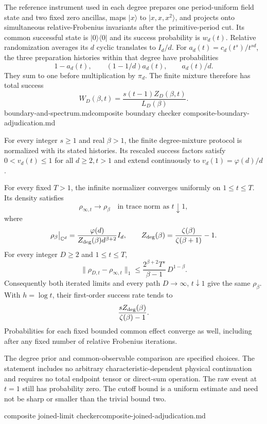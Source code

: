 The reference instrument used in each degree prepares one period-uniform
field state and two fixed zero ancillas, maps $|x\rangle$ to
$|x,x,x^2\rangle$, and projects onto simultaneous relative-Frobenius
invariants after the primitive-period cut. Its common successful state is
$|0\rangle\langle0|$ and its success probability is $w_d(t)$. Relative
randomization averages its $d$ cyclic translates to $I_d/d$.
For $a_d(t)=c_d(t^s)/t^{sd}$, the three preparation histories within
that degree have probabilities
\[
 1-a_d(t),\qquad (1-1/d)a_d(t),\qquad a_d(t)/d.
\]
They sum to one before multiplication by $\pi_d$. The finite mixture
therefore has total success
\[
 W_D(\beta,t)=\frac{s(t-1)Z_D(\beta,t)}{L_D(\beta)}.
\]
{boundary-and-spectrum.md}{composite boundary checker}
{composite-boundary-adjudication.md}

\begin{theorem}
\statusSketch\quad
For every integer $s\geq1$ and real $\beta>1$, the finite degree-mixture
protocol is normalized with its stated histories. Its rescaled success
factors satisfy $0<v_d(t)\leq1$ for all $d\geq2,t>1$ and extend
continuously to $v_d(1)=\varphi(d)/d$.

For every fixed $T>1$, the infinite normalizer converges uniformly on
$1\leq t\leq T$. Its density satisfies
\[
 \rho_{\infty,t}\longrightarrow\rho_\beta
       \quad\text{in trace norm as }t\downarrow1,
\]
where
\[
 \rho_\beta\big|_{\mathbb C^d}
 =\frac{\varphi(d)}{Z_{\rm deg}(\beta)d^{\beta+2}}I_d,\qquad
 Z_{\rm deg}(\beta)=\frac{\zeta(\beta)}{\zeta(\beta+1)}-1.
\]
For every integer $D\geq2$ and $1\leq t\leq T$,
\[
 \|\rho_{D,t}-\rho_{\infty,t}\|_1
 \leq \frac{2^{\beta+2}T^s}{\beta-1}\,D^{1-\beta}.
\]
Consequently both iterated limits and every path $D\to\infty$, $t\downarrow1$
give the same $\rho_\beta$. With $h=\log t$, their first-order success rate
tends to
\[
 \frac{sZ_{\rm deg}(\beta)}{\zeta(\beta)-1}.
\]
Probabilities for each fixed bounded common effect converge as well,
including after any fixed number of relative Frobenius iterations.
\end{theorem}
\begin{scope}
The degree prior and common-observable comparison are specified choices.
The statement includes no arbitrary characteristic-dependent physical
continuation and requires no total endpoint tensor or direct-sum operation.
The raw event at $t=1$ still has probability zero. The cutoff bound is a
uniform estimate and need not be sharp or smaller than the trivial bound two.
\end{scope}
{composite joined-limit checker}{composite-joined-adjudication.md}

